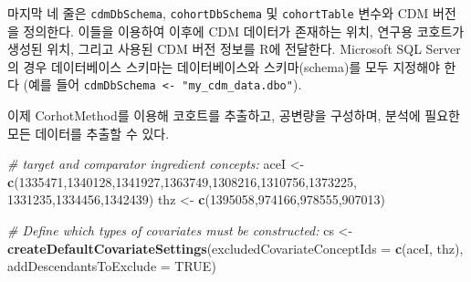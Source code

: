 \documentclass[11pt]{book}
\newenvironment{Shaded}{\begin{snugshade}}{\end{snugshade}}
\newcommand{\KeywordTok}[1]{\textcolor[rgb]{0.13,0.29,0.53}{\textbf{#1}}}
\newcommand{\DataTypeTok}[1]{\textcolor[rgb]{0.13,0.29,0.53}{#1}}
\newcommand{\DecValTok}[1]{\textcolor[rgb]{0.00,0.00,0.81}{#1}}
\newcommand{\StringTok}[1]{\textcolor[rgb]{0.31,0.60,0.02}{#1}}
\newcommand{\CommentTok}[1]{\textcolor[rgb]{0.56,0.35,0.01}{\textit{#1}}}
\newcommand{\OtherTok}[1]{\textcolor[rgb]{0.56,0.35,0.01}{#1}}
\newcommand{\NormalTok}[1]{#1}
\theoremstyle{definition}
\theoremstyle{definition}
\theoremstyle{definition}
\theoremstyle{remark}
\begin{document}
마지막 네 줄은 \texttt{cdmDbSchema}, \texttt{cohortDbSchema} 및
\texttt{cohortTable} 변수와 CDM 버전을 정의한다. 이들을 이용하여 이후에
CDM 데이터가 존재하는 위치, 연구용 코호트가 생성된 위치, 그리고 사용된
CDM 버전 정보를 R에 전달한다. Microsoft SQL Server의 경우 데이터베이스
스키마는 데이터베이스와 스키마(schema)를 모두 지정해야 한다 (예를 들어
\texttt{cdmDbSchema\ \textless{}-\ "my\_cdm\_data.dbo"}).

이제 CorhotMethod를 이용해 코호트를 추출하고, 공변량을 구성하며, 분석에
필요한 모든 데이터를 추출할 수 있다.

\begin{Shaded}
\begin{Highlighting}[]
\CommentTok{# target and comparator ingredient concepts:}
\NormalTok{aceI <-}\StringTok{ }\KeywordTok{c}\NormalTok{(}\DecValTok{1335471}\NormalTok{,}\DecValTok{1340128}\NormalTok{,}\DecValTok{1341927}\NormalTok{,}\DecValTok{1363749}\NormalTok{,}\DecValTok{1308216}\NormalTok{,}\DecValTok{1310756}\NormalTok{,}\DecValTok{1373225}\NormalTok{,}
          \DecValTok{1331235}\NormalTok{,}\DecValTok{1334456}\NormalTok{,}\DecValTok{1342439}\NormalTok{)}
\NormalTok{thz <-}\StringTok{ }\KeywordTok{c}\NormalTok{(}\DecValTok{1395058}\NormalTok{,}\DecValTok{974166}\NormalTok{,}\DecValTok{978555}\NormalTok{,}\DecValTok{907013}\NormalTok{)}

\CommentTok{# Define which types of covariates must be constructed:}
\NormalTok{cs <-}\StringTok{ }\KeywordTok{createDefaultCovariateSettings}\NormalTok{(}\DataTypeTok{excludedCovariateConceptIds =} \KeywordTok{c}\NormalTok{(aceI,}
\NormalTok{                                                                     thz),}
                                     \DataTypeTok{addDescendantsToExclude =} \OtherTok{TRUE}\NormalTok{)}


\end{Highlighting}
\end{Shaded}
\end{document}

